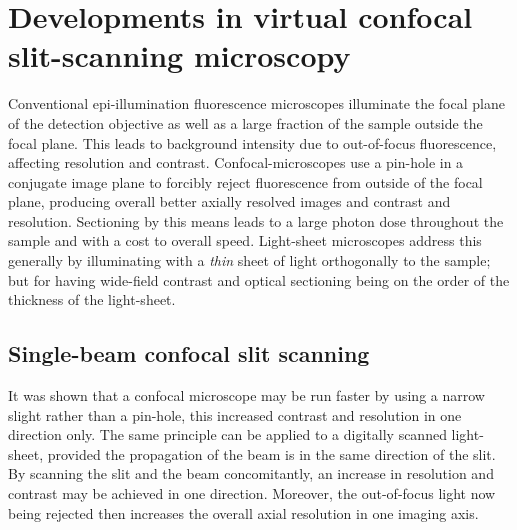 \ifpdf
    \graphicspath{{Chapters/dualslit/Figs/Raster/}{Chapters/dualslit/Figs/PDF/}{Chapters/dualslit/Figs/}}
\else
    \graphicspath{{Chapters/dualslit/Figs/Vector/}{Chapters/dualslit/Figs/}}
\fi

\chapter{Developments in virtual confocal slit-scanning microscopy}


Conventional epi-illumination fluorescence microscopes illuminate the focal plane of the detection objective as well as a large fraction of the sample outside the focal plane.
This leads to background intensity due to out-of-focus fluorescence, affecting resolution and contrast.
Confocal-microscopes use a pin-hole in a conjugate image plane to forcibly reject fluorescence from outside of the focal plane, producing overall better axially resolved images and contrast and resolution.
Sectioning by this means leads to a large photon dose throughout the sample and with a cost to overall speed.
Light-sheet microscopes address this generally by illuminating with a \emph{thin} sheet of light orthogonally to the sample; but for having wide-field contrast and optical sectioning being on the order of the thickness of the light-sheet.

\section{Single-beam confocal slit scanning}

It was shown that a confocal microscope may be run faster by using a narrow slight rather than a pin-hole, this increased contrast and resolution in one direction only.
The same principle can be applied to a digitally scanned light-sheet, provided the propagation of the beam is in the same direction of the slit.
By scanning the slit and the beam concomitantly, an increase in resolution and contrast may be achieved in one direction.
Moreover, the out-of-focus light now being rejected then increases the overall axial resolution in one imaging axis.

